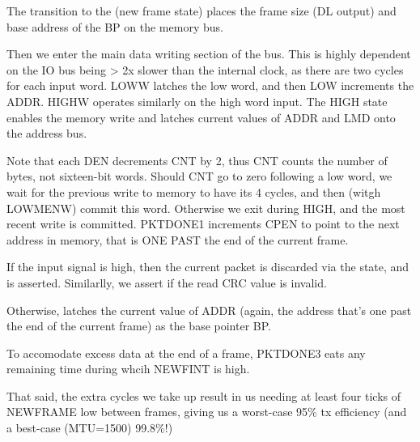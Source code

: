 The transition to the  (new frame state) places the frame
size (DL output) and base address of the BP on the memory bus.

Then we enter the main data writing section of the bus. This is highly
dependent on the IO bus being > 2x slower than the internal clock, as
there are two cycles for each input word. LOWW latches the low word,
and then LOW increments the ADDR. HIGHW operates similarly on the
high word input. The HIGH state enables the memory write and latches
current values of ADDR and LMD onto the address bus.

Note that each DEN decrements CNT by 2, thus CNT counts the number of
bytes, not sixteen-bit words. Should CNT go to zero following a low
word, we wait for the previous write to memory to have its 4 cycles,
and then (witgh LOWMENW) commit this word. Otherwise we exit during
HIGH, and the most recent write is committed. PKTDONE1 increments CPEN
to point to the next address in memory, that is ONE PAST the end of
the current frame.

If the input  signal is high, then the current packet
is discarded via the  state, and 
is asserted.  Similarlly, we assert  if the read
CRC value is invalid.

Otherwise,  latches the current value of ADDR
(again, the address that's one past the end of the current frame) as
the base pointer BP.

To accomodate excess data at the end of a frame, PKTDONE3 eats any
remaining time during whcih NEWFINT is high.

That said, the extra cycles we take up result in us needing at least
four ticks of NEWFRAME low between frames, giving us a worst-case 95\%
tx efficiency (and a best-case (MTU=1500) 99.8\%!)
